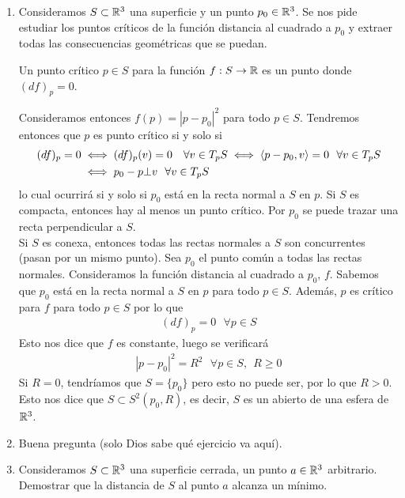 \begin{ejercicio}
\begin{enumerate}
        \item Consideramos $S\subset \mathbb{R}^3$ una superficie y un punto $p_0\in \mathbb{R}^3$. Se nos pide estudiar los puntos críticos de la función distancia al cuadrado a $p_0$ y extraer todas las consecuencias geométricas que se puedan.
        
        \begin{definicion}
            Un punto crítico $p\in S$ para la función $f:S\to \mathbb{R}$ es un punto donde $(df)_p = 0$.
        \end{definicion}

        Consideramos entonces $f(p)=|p-p_0|^2$ para todo $p\in S$. Tendremos entonces que $p$ es punto crítico si y solo si
        \begin{align*}
            (df)_p = 0 &\iff (df)_p(v) = 0 \ \ \ \forall v \in T_pS \iff
            \langle p-p_0, v \rangle = 0 \ \ \forall v\in T_pS \\
            &\iff p_0-p \bot v \ \ \forall v \in T_pS 
        \end{align*}
        lo cual ocurrirá si y solo si $p_0$ está en la recta normal a $S$ en $p$. Si $S$ es compacta, entonces hay al menos un punto crítico. Por $p_0$ se puede trazar una recta perpendicular a $S$.\\

        Si $S$ es conexa, entonces todas las rectas normales a $S$ son concurrentes (pasan por un mismo punto). Sea $p_0$ el punto común a todas las rectas normales. Consideramos la función distancia al cuadrado a $p_0$, $f$. Sabemos que $p_0$ está en la recta normal a $S$ en $p$ para todo $p\in S$. Además, $p$ es crítico para $f$ para todo $p\in S$ por lo que 
        \begin{gather*}
            (df)_p = 0 \ \ \ \forall p \in S
        \end{gather*}
        Esto nos dice que $f$ es constante, luego se verificará
        \begin{gather*}
            |p-p_0|^2 = R^2\ \ \ \forall p\in S,\ \ R \geq 0
        \end{gather*}
        Si $R=0$, tendríamos que $S=\{p_0\}$ pero esto no puede ser, por lo que $R>0$. Esto nos dice que $S\subset S^2(p_0, R)$, es decir, $S$ es un abierto de una esfera de $\mathbb{R}^3$.

        \item Buena pregunta (solo Dios sabe qué ejercicio va aquí).
        
        \item Consideramos $S\subset \mathbb{R}^3$ una superficie cerrada, un punto $a\in \mathbb{R}^3$ arbitrario. Demostrar que la distancia de $S$ al punto $a$ alcanza un mínimo.\\
        

\end{enumerate}
\end{ejercicio}
